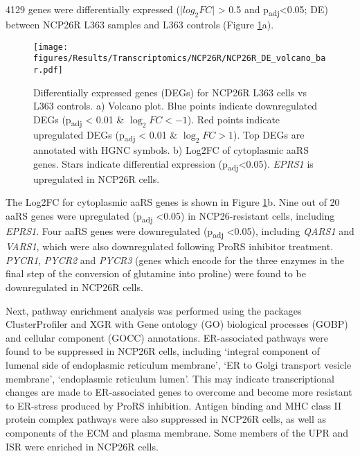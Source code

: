 4129 genes were differentially expressed ($\lvert log_{2}FC \rvert$ > 0.5 and p\textsubscript{adj}<0.05; DE) between NCP26R L363 samples and L363 controls (Figure \ref{fig:NCP26R_DE}a).
\begin{figure}[htb]
\centering
\texttt{[image: figures/Results/Transcriptomics/NCP26R/NCP26R\_DE\_volcano\_bar.pdf]}
\caption[NCP26R bulk RNA-seq differentially expression]{Differentially expressed genes (DEGs) for NCP26R L363 cells vs L363 controls.
a) Volcano plot. Blue points indicate downregulated DEGs (p\textsubscript{adj} < 0.01 \& $\log_{2}FC < -1$).
Red points indicate upregulated DEGs (p\textsubscript{adj} < 0.01 \& $\log_{2}FC > 1$).
Top DEGs are annotated with HGNC symbols.
b) Log2FC of cytoplasmic aaRS genes.
Stars indicate differential expression (p\textsubscript{adj}<0.05).
\textit{EPRS1} is upregulated in NCP26R cells.
}
\label{fig:NCP26R_DE}
\end{figure}
The Log2FC for cytoplasmic aaRS genes is shown in Figure \ref{fig:NCP26R_DE}b.
Nine out of 20 aaRS genes were upregulated (p\textsubscript{adj} <0.05) in NCP26-resistant cells, including \textit{EPRS1}.
Four aaRS genes were downregulated (p\textsubscript{adj} <0.05), including \textit{QARS1} and \textit{VARS1}, which were also downregulated following ProRS inhibitor treatment.
\textit{PYCR1}, \textit{PYCR2} and \textit{PYCR3} (genes which encode for the three enzymes in the final step of the conversion of glutamine into proline) were found to be downregulated in NCP26R cells.

Next, pathway enrichment analysis was performed using the packages ClusterProfiler and XGR with Gene ontology (GO) biological processes (GOBP) and cellular component (GOCC) annotations.
ER-associated pathways were found to be suppressed in NCP26R cells, including `integral component of lumenal side of endoplasmic reticulum membrane', `ER to Golgi transport vesicle membrane', `endoplasmic reticulum lumen'.
This may indicate transcriptional changes are made to ER-associated genes to overcome and become more resistant to ER-stress produced by ProRS inhibition.
Antigen binding and MHC class II protein complex pathways were also suppressed in NCP26R cells, as well as components of the ECM and plasma membrane.
Some members of the UPR and ISR were enriched in NCP26R cells.


